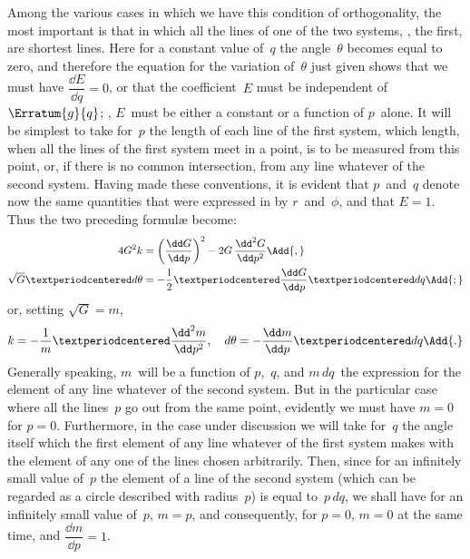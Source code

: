 Among the various cases in which we have this condition of orthogonality, the
most important is that in which all the lines of one of the two systems, \eg, the
first, are shortest lines. Here for a constant value of~$q$ the angle~$\theta$ becomes equal to
zero, and therefore the equation for the variation of~$\theta$ just given shows that we must
have $\dfrac{\dd E}{\dd q} = 0$, or that the coefficient~$E$ must be independent of~$\Erratum{g}{q}$; \ie, $E$~must be
either a constant or a function of $p$~alone. It will be simplest to take for~$p$
the length of each line of the first system, which length, when all the lines of the
first system meet in a point, is to be measured from this point, or, if there is no
common intersection, from any line whatever of the second system. Having made
these conventions, it is evident that $p$~and~$q$ denote now the same quantities that
were expressed in  by $r$~and~$\phi$, and that $E = 1$. Thus the two preceding
formulæ become:
\begin{align*}
4G^{2}k
  &= \left(\frac{\dd G}{\dd p}\right)^{2} - 2G\, \frac{\dd^{2} G}{\dd p^{2}}\Add{,} \\
\sqrt{G}·d\theta
  &= -\frac{1}{2}·\frac{\dd G}{\dd p}·dq\Add{;}
\end{align*}
or, setting $\sqrt{G} = m$,
\[
k = -\frac{1}{m}·\frac{\dd^{2} m}{\dd p^{2}},\quad
d\theta = -\frac{\dd m}{\dd p}·dq\Add{.}
\]
Generally speaking, $m$~will be a function of $p$,~$q$, and $m\, dq$~the expression for the element
of any line whatever of the second system. But in the particular case where
all the lines~$p$ go out from the same point, evidently we must have $m = 0$ for $p = 0$.
Furthermore, in the case under discussion we will take for~$q$ the angle itself which
the first element of any line whatever of the first system makes with the element of
any one of the lines chosen arbitrarily. Then, since for an infinitely small value of~$p$
the element of a line of the second system (which can be regarded as a circle
described with radius~$p$) is equal to~$p\, dq$, we shall have for an infinitely small value
of~$p$, $m = p$, and consequently, for $p = 0$, $m = 0$ at the same time, and $\dfrac{\dd m}{\dd p} = 1$.



